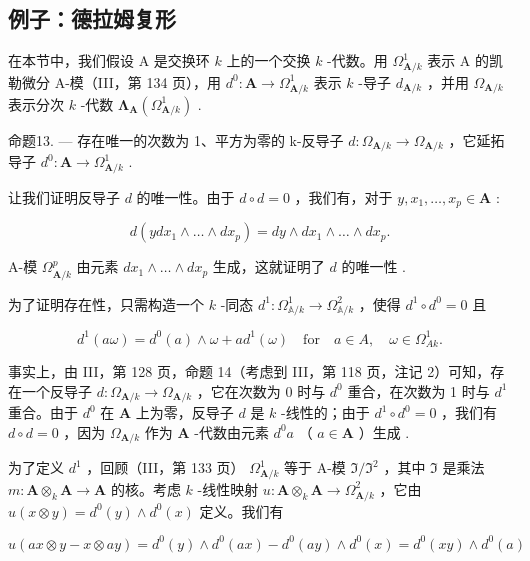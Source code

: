 \subsection{例子：德拉姆复形}

在本节中，我们假设 A 是交换环 \(k\) 上的一个交换 \(k\) -代数。用 \(\Omega_{\mathbf{A}/k}^{1}\) 表示 A 的凯勒微分 A-模（III，第 134 页），用 \(d^{0}: \mathbf{A} \to \Omega_{\mathbf{A}/k}^{1}\) 表示 \(k\) -导子 \(d_{\mathbf{A}/k}\) ，并用 \(\Omega_{\mathbf{A}/k}\) 表示分次 \(k\) -代数 \(\boldsymbol{\Lambda}_{\mathbf{A}}(\Omega_{\mathbf{A}/k}^{1})\) .

命题13. --- 存在唯一的次数为 1、平方为零的 k-反导子 \(d: \Omega_{\mathbf{A}/k} \to \Omega_{\mathbf{A}/k}\) ，它延拓导子 \(d^{0}: \mathbf{A} \to \Omega_{\mathbf{A}/k}^{1}\) .

让我们证明反导子 \(d\) 的唯一性。由于 \(d \circ d = 0\) ，我们有，对于 \(y, x_1, \ldots, x_p \in \mathbf{A}\) :

\[
d \left(y d x _ {1} \wedge \dots \wedge d x _ {p}\right) = d y \wedge d x _ {1} \wedge \dots \wedge d x _ {p}.
\]

A-模 \(\Omega_{\mathbf{A}/k}^{p}\) 由元素 \(dx_{1} \wedge \ldots \wedge dx_{p}\) 生成，这就证明了 \(d\) 的唯一性 .

为了证明存在性，只需构造一个 \(k\) -同态 \(d^{1}:\Omega_{\mathbb{A}/k}^{1}\to\Omega_{\mathbb{A}/k}^{2}\) ，使得 \(d^{1}\circ d^{0}=0\) 且

\[
d ^ {1} (a \omega) = d ^ {0} (a) \wedge \omega + a d ^ {1} (\omega) \quad \text {for} \quad a \in A, \quad \omega \in \Omega_ {A k} ^ {1}.\tag{11}
\]

事实上，由 III，第 128 页，命题 14（考虑到 III，第 118 页，注记 2）可知，存在一个反导子 \(d: \Omega_{\mathbf{A}/k} \to \Omega_{\mathbf{A}/k}\) ，它在次数为 0 时与 \(d^{0}\) 重合，在次数为 1 时与 \(d^{1}\) 重合。由于 \(d^{0}\) 在 \(\mathbf{A}\) 上为零，反导子 \(d\) 是 \(k\) -线性的；由于 \(d^{1} \circ d^{0} = 0\) ，我们有 \(d \circ d = 0\) ，因为 \(\Omega_{\mathbf{A}/k}\) 作为 \(\mathbf{A}\) -代数由元素 \(d^{0} a\) （ \(a \in \mathbf{A}\) ）生成 .

为了定义 \(d^{1}\) ，回顾（III，第 133 页） \(\Omega_{\mathbf{A}/k}^{1}\) 等于 A-模 \(\mathfrak{I}/\mathfrak{I}^{2}\) ，其中 \(\mathfrak{I}\) 是乘法 \(m: \mathbf{A} \otimes_{k} \mathbf{A} \to \mathbf{A}\) 的核。考虑 \(k\) -线性映射 \(u: \mathbf{A} \otimes_{k} \mathbf{A} \to \Omega_{\mathbf{A}/k}^{2}\) ，它由 \(u(x \otimes y) = d^{0}(y) \wedge d^{0}(x)\) 定义。我们有

\[
u (a x \otimes y - x \otimes a y) = d ^ {0} (y) \wedge d ^ {0} (a x) - d ^ {0} (a y) \wedge d ^ {0} (x) = d ^ {0} (x y) \wedge d ^ {0} (a)
\]

